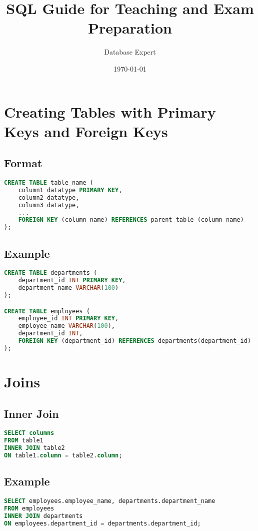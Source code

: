 \documentclass{article}
\begin{document}
\title{SQL Guide for Teaching and Exam Preparation}
\author{Database Expert}
\date{\today}
\maketitle

\tableofcontents
\newpage

\section{Creating Tables with Primary Keys and Foreign Keys}

\subsection{Format}
\begin{lstlisting}[language=SQL]
CREATE TABLE table_name (
    column1 datatype PRIMARY KEY,
    column2 datatype,
    column3 datatype,
    ...
    FOREIGN KEY (column_name) REFERENCES parent_table (column_name)
);
\end{lstlisting}

\subsection{Example}
\begin{lstlisting}[language=SQL]
CREATE TABLE departments (
    department_id INT PRIMARY KEY,
    department_name VARCHAR(100)
);

CREATE TABLE employees (
    employee_id INT PRIMARY KEY,
    employee_name VARCHAR(100),
    department_id INT,
    FOREIGN KEY (department_id) REFERENCES departments(department_id)
);
\end{lstlisting}

\newpage
\section{Joins}

\subsection{Inner Join}
\begin{lstlisting}[language=SQL]
SELECT columns
FROM table1
INNER JOIN table2
ON table1.column = table2.column;
\end{lstlisting}

\subsection{Example}
\begin{lstlisting}[language=SQL]
SELECT employees.employee_name, departments.department_name
FROM employees
INNER JOIN departments
ON employees.department_id = departments.department_id;
\end{lstlisting}
\end{document}

